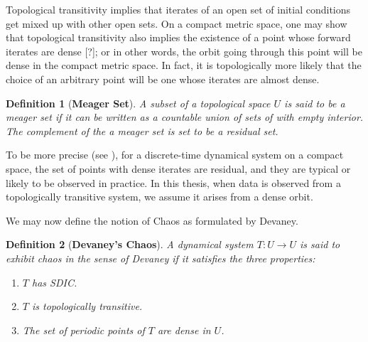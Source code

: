 \documentclass[a4paper,12pt,twoside]{report}
\newtheorem{Definition}{Definition}[]
\begin{document}
Topological transitivity implies that iterates of an open set of initial conditions get mixed up with other open sets. On a compact metric space, one may show that topological transitivity also implies the existence of a point whose forward iterates are dense [?]; or in other words, the orbit going through this point will be dense in the compact metric space. 
In fact, it is topologically more likely that the choice of an arbitrary point will be one whose iterates are almost dense.

\begin{Definition}
  [\bf {Meager Set}]\label{Dfn_Meager Set}\rm
A subset of a topological space $U$ is said to be a meager set if it can be written as a countable union of sets of with empty interior. The complement of the a meager set is set to be a residual set.
\end{Definition}

To be more precise (see \cite{de2013elements}), for a discrete-time dynamical system on a compact space, the set of points with dense iterates are residual, and they are typical or likely to be observed in practice. In this thesis, when data is observed from a topologically transitive system, we assume it arises from a dense orbit.

We may now define the notion of Chaos as formulated by Devaney\cite{devaney2018introduction}.
\begin{Definition}
  [\bf {Devaney's Chaos}]\label{Dfn_ChaosDec}\rm
	A dynamical system $T: U \to U$ is said to exhibit chaos in the sense of Devaney if it satisfies the three properties:
	\vspace{-5mm}
  \begin{enumerate}
		\item $T$ has SDIC.
		\item $T$ is topologically transitive.
		\item The set of periodic points of $T$ are dense in $U$. 
	\end{enumerate}
\end{Definition}
\end{document}
